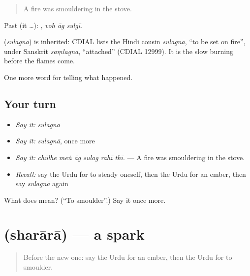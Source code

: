 \begin{quote}
A fire was smouldering in the stove.
\end{quote}

Past (it …):   , \emph{voh āg sulgī}.

\begin{cousinweb}
\textbf{} (\emph{sulagnā}) is inherited: CDIAL lists the Hindi cousin \emph{sulagnā}, \textquotedblleft{}to be set on fire\textquotedblright{}, under Sanskrit \emph{saṃlagna}, \textquotedblleft{}attached\textquotedblright{} (CDIAL 12999). It is the slow burning before the flames come.
\end{cousinweb}

\begin{grammarlens}[title={What you've built}]
One more word for telling what happened.
\end{grammarlens}

\subsection*{Your turn}
\begin{itemize}
\raggedright
  \item \emph{Say it:} \emph{sulagnā}
  \item \emph{Say it:} \emph{sulagnā}, once more
  \item \emph{Say it:} \emph{chūlhe meṅ āg sulag rahī thī.} — A fire was smouldering in the stove.
  \item \emph{Recall:} say the Urdu for to steady oneself, then the Urdu for an ember, then say \emph{sulagnā} again
\end{itemize}

\begin{tcolorbox}[breakable,colback=teal!4,colframe=teal!35!black,title={Before you move on}]
What does  mean? (\textquotedblleft{}To smoulder\textquotedblright{}.) Say it once more.
\end{tcolorbox}
\section[\texorpdfstring{\ur{شرارہ} (sharārā)}{شرارہ (sharārā)}]{ (sharārā) — a spark}

\label{lesson:UR-C287-sharara}



\begin{quote}
Before the new one: say the Urdu for an ember, then the Urdu for to smoulder.
\end{quote}

